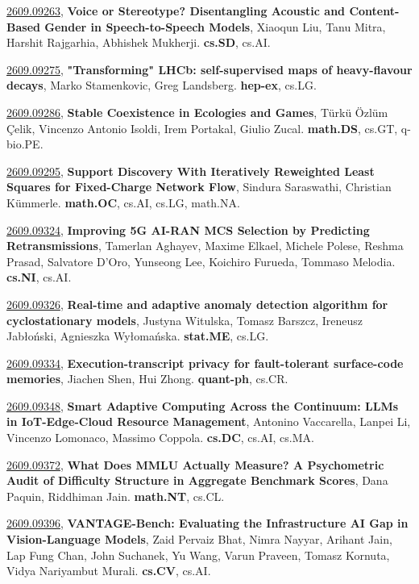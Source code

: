 \documentclass[9pt, a4paper]{article}
\theoremstyle{plain}
\theoremstyle{definition}
\theoremstyle{remark}
\newcommand{\arxivwithtarget}[3]{\hypertarget{#1}{}\href{https://arxiv.org/abs/#1}{#1}, \textbf{\textcolor{arxivblue}{#2}}, #3. }
\begin{document}
\arxivwithtarget{2609.09263}{Voice or Stereotype? Disentangling Acoustic and Content-Based Gender in Speech-to-Speech Models}{Xiaoqun Liu, Tanu Mitra, Harshit Rajgarhia, Abhishek Mukherji}\textbf{cs.SD}, cs.AI.



\arxivwithtarget{2609.09275}{"Transforming" LHCb: self-supervised maps of heavy-flavour decays}{Marko Stamenkovic, Greg Landsberg}\textbf{hep-ex}, cs.LG.



\arxivwithtarget{2609.09286}{Stable Coexistence in Ecologies and Games}{Türkü Özlüm Çelik, Vincenzo Antonio Isoldi, Irem Portakal, Giulio Zucal}\textbf{math.DS}, cs.GT, q-bio.PE.



\arxivwithtarget{2609.09295}{Support Discovery With Iteratively Reweighted Least Squares for Fixed-Charge Network Flow}{Sindura Saraswathi, Christian Kümmerle}\textbf{math.OC}, cs.AI, cs.LG, math.NA.



\arxivwithtarget{2609.09324}{Improving 5G AI-RAN MCS Selection by Predicting Retransmissions}{Tamerlan Aghayev, Maxime Elkael, Michele Polese, Reshma Prasad, Salvatore D'Oro, Yunseong Lee, Koichiro Furueda, Tommaso Melodia}\textbf{cs.NI}, cs.AI.



\arxivwithtarget{2609.09326}{Real-time and adaptive anomaly detection algorithm for cyclostationary models}{Justyna Witulska, Tomasz Barszcz, Ireneusz Jabłoński, Agnieszka Wyłomańska}\textbf{stat.ME}, cs.LG.



\arxivwithtarget{2609.09334}{Execution-transcript privacy for fault-tolerant surface-code memories}{Jiachen Shen, Hui Zhong}\textbf{quant-ph}, cs.CR.



\arxivwithtarget{2609.09348}{Smart Adaptive Computing Across the Continuum: LLMs in IoT-Edge-Cloud Resource Management}{Antonino Vaccarella, Lanpei Li, Vincenzo Lomonaco, Massimo Coppola}\textbf{cs.DC}, cs.AI, cs.MA.



\arxivwithtarget{2609.09372}{What Does MMLU Actually Measure? A Psychometric Audit of Difficulty Structure in Aggregate Benchmark Scores}{Dana Paquin, Riddhiman Jain}\textbf{math.NT}, cs.CL.



\arxivwithtarget{2609.09396}{VANTAGE-Bench: Evaluating the Infrastructure AI Gap in Vision-Language Models}{Zaid Pervaiz Bhat, Nimra Nayyar, Arihant Jain, Lap Fung Chan, John Suchanek, Yu Wang, Varun Praveen, Tomasz Kornuta, Vidya Nariyambut Murali}\textbf{cs.CV}, cs.AI.
\end{document}
